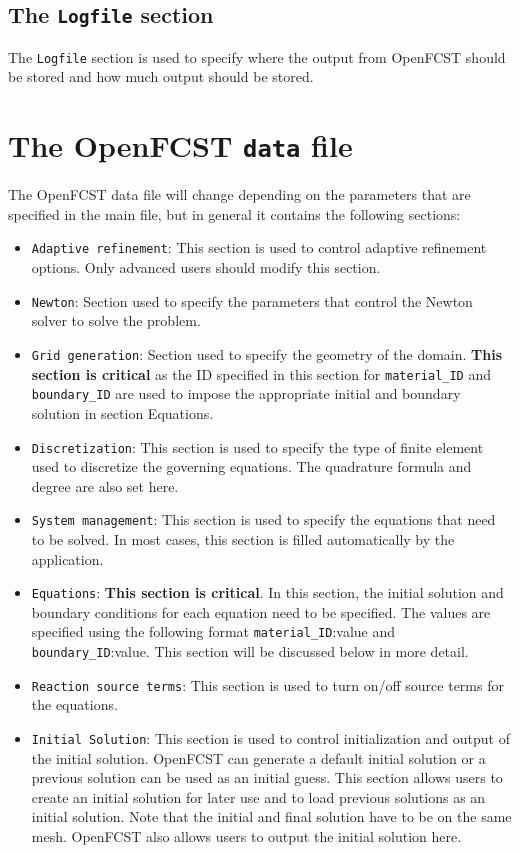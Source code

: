 \subsection{The \texttt{Logfile} section}
The \texttt{Logfile} section is used to specify where the output from OpenFCST should be stored and how much output should be stored.

\section{The OpenFCST \texttt{data} file}

The OpenFCST data file will change depending on the parameters that are specified in the main file, but in general it contains the following sections:
\begin{itemize}
 \item \texttt{Adaptive refinement}: This section is used to control adaptive refinement options. Only advanced users should modify this section.
 \item \texttt{Newton}: Section used to specify the parameters that control the Newton solver to solve the problem.
 \item \texttt{Grid generation}: Section used to specify the geometry of the domain. \textbf{This section is critical} as the ID specified in this section for \texttt{material\_ID} and \texttt{boundary\_ID} are used to impose the appropriate initial and boundary solution in section Equations. 
 \item \texttt{Discretization}: This section is used to specify the type of finite element used to discretize the governing equations. The quadrature formula and degree are also set here.
 \item \texttt{System management}: This section is used to specify the equations that need to be solved. In most cases, this section is filled automatically by the application.
 \item \texttt{Equations}: \textbf{This section is critical}. In this section, the initial solution and boundary conditions for each equation need to be specified. The values are specified using the following format \texttt{material\_ID}:value and \texttt{boundary\_ID}:value. This section will be discussed below in more detail.
 \item \texttt{Reaction source terms}: This section is used to turn on/off source terms for the equations.
 \item \texttt{Initial Solution}: This section is used to control initialization and output of the initial solution. OpenFCST can generate a default initial solution or a previous solution can be used as an initial guess. This section allows users to create an initial solution for later use and to load previous solutions as an initial solution. Note that the initial and final solution have to be on the same mesh. OpenFCST also allows users to output the initial solution here.

\end{itemize}
